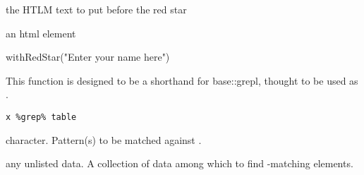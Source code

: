 \documentclass[letterpaper]{book}
\begin{document}
%
\begin{Arguments}
\begin{ldescription}
\item[\code{text}] the HTLM text to put before the red star
\end{ldescription}
\end{Arguments}
%
\begin{Value}
an html element
\end{Value}
%
\begin{Examples}
\begin{ExampleCode}
withRedStar("Enter your name here")

\end{ExampleCode}
\end{Examples}
%
\begin{Description}\relax
This function is designed to be a shorthand for base::grepl, thought to be used as .
\end{Description}
%
\begin{Usage}
\begin{verbatim}
x %grep% table
\end{verbatim}
\end{Usage}
%
\begin{Arguments}
\begin{ldescription}
\item[\code{x}] character. Pattern(s) to be matched against .

\item[\code{table}] any unlisted data. A collection of data among which to find -matching
elements.
\end{ldescription}
\end{Arguments}
\printindex{}
\end{document}
